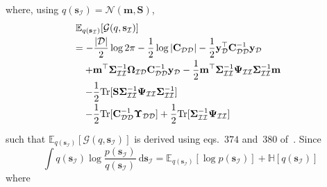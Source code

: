 \documentclass[conference]{IEEEtran}
\begin{document}
	\vspace{-1mm}
	where, using $q(\mathbf{s}_\mathcal{I})=\mathcal{N}(\mathbf{m},\mathbf{S})$,%
	\begin{equation*}
		\hspace{-1.7mm}
		\begin{array}{l}
			\displaystyle\mathbb{E}_{q(\mathbf{s}_\mathcal{I})}[\mathcal{G}(q,\mathbf{s}_\mathcal{I})] \vspace{1mm}\\
			\displaystyle=-\frac{|\mathcal{D}|}{2}\log2\pi-\frac{1}{2}\log|\mathbf{C}_\mathcal{DD}|-\frac{1}{2}\mathbf{y}_\mathcal{D}^\top\mathbf{C}_\mathcal{DD}^{-1}\mathbf{y}_\mathcal{D}\vspace{1mm}\\
			\displaystyle\quad+\mathbf{m}^\top\mathbf{\Sigma}_\mathcal{II}^{-1}\mathbf{\Omega}_\mathcal{ID}\mathbf{C}_\mathcal{DD}^{-1}\mathbf{y}_\mathcal{D}-\frac{1}{2}\mathbf{m}^\top\mathbf{\Sigma}_\mathcal{II}^{-1}\mathbf{\Psi}_\mathcal{II}\mathbf{\Sigma}_\mathcal{II}^{-1}\mathbf{m}\vspace{1mm}\\
			\displaystyle\quad-\frac{1}{2}\mathrm{Tr}[\mathbf{S}\mathbf{\Sigma}_\mathcal{II}^{-1}\mathbf{\Psi}_\mathcal{II}\mathbf{\Sigma}_\mathcal{II}^{-1}]\vspace{1mm}\\
			\displaystyle\quad-\frac{1}{2}\mathrm{Tr}[\mathbf{C}_\mathcal{DD}^{-1}\mathbf{\Upsilon}_\mathcal{DD}]+\frac{1}{2}\mathrm{Tr}[\mathbf{\Sigma}_\mathcal{II}^{-1}\mathbf{\Psi}_\mathcal{II}] \vspace{1mm}\\
			
		\end{array}
	\end{equation*}
	such that $\mathbb{E}_{q(\mathbf{s}_\mathcal{I})}[\mathcal{G}(q,\mathbf{s}_\mathcal{I})]$ is derived using eqs.~$374$ and~$380$ of~\cite{IMM2012-03274}. Since \vspace{-1mm} 
	\begin{equation*}
		\int q(\mathbf{s}_\mathcal{I})\log\dfrac{p(\mathbf{s}_\mathcal{I})}{q(\mathbf{s}_\mathcal{I})}\ \mathrm{d}\mathbf{s}_\mathcal{I}=\mathbb{E}_{q(\mathbf{s}_\mathcal{I})}[\log p(\mathbf{s}_\mathcal{I})]+\mathbb{H}[q(\mathbf{s}_\mathcal{I})]
	\end{equation*}
	\vspace{-1mm}
	where
\end{document}
